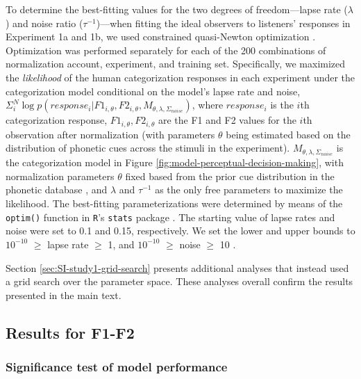 \documentclass[preprint]{JASA}
\begin{document}
To determine the best-fitting values for the two degrees of freedom---lapse rate (\(\lambda\)) and noise ratio (\(\tau^{-1}\))---when fitting the ideal observers to listeners' responses in Experiment 1a and 1b, we used constrained quasi-Newton optimization \citep{byrd1995}. Optimization was performed separately for each of the 200 combinations of normalization account, experiment, and training set. Specifically, we maximized the \emph{likelihood} of the human categorization responses in each experiment under the categorization model conditional on the model's lapse rate and noise, \(\Sigma_i^N \log p(response_i | F1_{i,\theta}, F2_{i,\theta}, M_{\theta, \lambda, \Sigma_{noise}})\), where \(response_i\) is the \(i\)th categorization response, \(F1_{i,\theta}, F2_{i,\theta}\) are the F1 and F2 values for the \(i\)th observation after normalization (with parameters \(\theta\) being estimated based on the distribution of phonetic cues across the stimuli in the experiment). \(M_{\theta, \lambda, \Sigma_{noise}}\) is the categorization model in Figure \ref{fig:model-perceptual-decision-making}, with normalization parameters \(\theta\) fixed based from the prior cue distribution in the phonetic database \citep{xie-jaeger2020}, and \(\lambda\) and \(\tau^{-1}\) as the only free parameters to maximize the likelihood. The best-fitting parameterizations were determined by means of the \texttt{optim()} function in \texttt{R}'s \texttt{stats} package \citep{R-base}. The starting value of lapse rates and noise were set to 0.1 and 0.15, respectively. We set the lower and upper bounds to \ensuremath{10^{-10}} \(\geq\) lapse rate \(\geq\) 1, and \ensuremath{10^{-10}} \(\geq\) noise \(\geq\) 10 \citep[i.e., including values well beyond previously observed estimates for perceptual noise in][p.~1698]{kronrod2016}.

Section \ref{sec:SI-study1-grid-search} presents additional analyses that instead used a grid search over the parameter space. These analyses overall confirm the results presented in the main text.

\subsection{Results for F1-F2}\label{results-for-f1-f2}

\subsubsection{Significance test of model performance}\label{sec:SI-sign-test}
\end{document}
